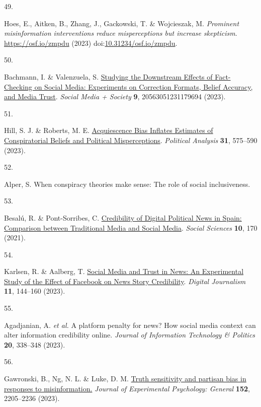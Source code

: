 \documentclass[
  doc,floatsintext]{apa6}
\newlength{\cslhangindent}
\newlength{\csllabelwidth}
\newenvironment{CSLReferences}[2] %
 {\begin{list}{}{%
  \setlength{\itemindent}{0pt}
  \setlength{\leftmargin}{0pt}
  \setlength{\parsep}{0pt}
  \ifodd #1
   \setlength{\leftmargin}{\cslhangindent}
   \setlength{\itemindent}{-1\cslhangindent}
  \fi
  \setlength{\itemsep}{#2\baselineskip}}}
 {\end{list}}
\newcommand{\CSLLeftMargin}[1]{\parbox[t]{\csllabelwidth}{\strut#1\strut}}
\newcommand{\CSLRightInline}[1]{\parbox[t]{\linewidth - \csllabelwidth}{\strut#1\strut}}
\begin{document}
\begin{CSLReferences}{0}{0}
\CSLLeftMargin{49. }%
\CSLRightInline{Hoes, E., Aitken, B., Zhang, J., Gackowski, T. \& Wojcieszak, M. \emph{Prominent misinformation interventions reduce misperceptions but increase skepticism}. \url{https://osf.io/zmpdu} (2023) doi:\href{https://doi.org/10.31234/osf.io/zmpdu}{10.31234/osf.io/zmpdu}.}

\CSLLeftMargin{50. }%
\CSLRightInline{Bachmann, I. \& Valenzuela, S. \href{https://doi.org/10.1177/20563051231179694}{Studying the Downstream Effects of Fact-Checking on Social Media: Experiments on Correction Formats, Belief Accuracy, and Media Trust}. \emph{Social Media + Society} \textbf{9}, 20563051231179694 (2023).}

\CSLLeftMargin{51. }%
\CSLRightInline{Hill, S. J. \& Roberts, M. E. \href{https://doi.org/10.1017/pan.2022.28}{Acquiescence Bias Inflates Estimates of Conspiratorial Beliefs and Political Misperceptions}. \emph{Political Analysis} \textbf{31}, 575--590 (2023).}

\CSLLeftMargin{52. }%
\CSLRightInline{Alper, S. When conspiracy theories make sense: The role of social inclusiveness.}

\CSLLeftMargin{53. }%
\CSLRightInline{Besalú, R. \& Pont-Sorribes, C. \href{https://doi.org/10.3390/socsci10050170}{Credibility of Digital Political News in Spain: Comparison between Traditional Media and Social Media}. \emph{Social Sciences} \textbf{10}, 170 (2021).}

\CSLLeftMargin{54. }%
\CSLRightInline{Karlsen, R. \& Aalberg, T. \href{https://doi.org/10.1080/21670811.2021.1945938}{Social Media and Trust in News: An Experimental Study of the Effect of Facebook on News Story Credibility}. \emph{Digital Journalism} \textbf{11}, 144--160 (2023).}

\CSLLeftMargin{55. }%
\CSLRightInline{Agadjanian, A. \emph{et al.} A platform penalty for news? How social media context can alter information credibility online. \emph{Journal of Information Technology \& Politics} \textbf{20}, 338--348 (2023).}

\CSLLeftMargin{56. }%
\CSLRightInline{Gawronski, B., Ng, N. L. \& Luke, D. M. \href{https://doi.org/10.1037/xge0001381}{Truth sensitivity and partisan bias in responses to misinformation.} \emph{Journal of Experimental Psychology: General} \textbf{152}, 2205--2236 (2023).}


\end{CSLReferences}
\end{document}
